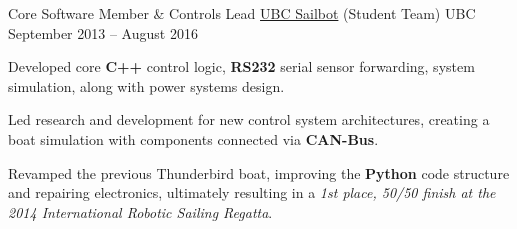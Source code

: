 \begin{cventries}
  \cventry
    {Core Software Member \& Controls Lead}
    {\href{https://www.ubcsailbot.org/}{UBC Sailbot} (Student Team)}
    {UBC}
    {September 2013 -- August 2016}
    {
        \begin{cvitems}
            \item {Developed core \textbf{C++} control logic, \textbf{RS232} serial sensor forwarding, system simulation, along with power systems design.}
            \item Led research and development for new control system architectures, creating a boat simulation with components connected via \textbf{CAN-Bus}.
            \item Revamped the previous Thunderbird boat, improving the \textbf{Python} code structure and repairing electronics, ultimately
            resulting in a \emph{1st place, 50/50 finish at the 2014 International Robotic Sailing Regatta}.
        \end{cvitems}
    }

\end{cventries}

